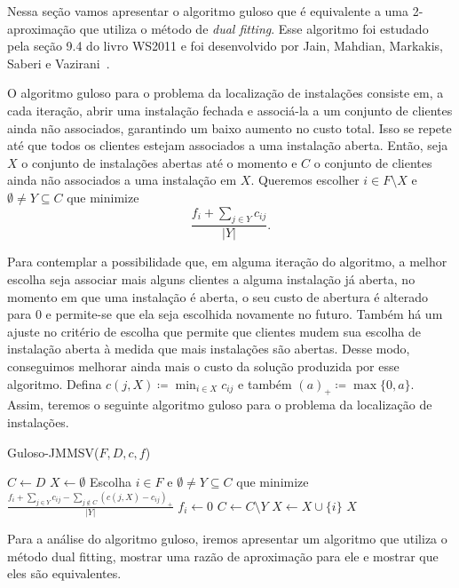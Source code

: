 Nessa seção vamos apresentar o algoritmo guloso que é equivalente a uma 2-aproximação que utiliza o método de \emph{dual fitting}. Esse algoritmo foi estudado pela seção 9.4 do livro WS2011 e foi desenvolvido por Jain, Mahdian, Markakis, Saberi e Vazirani~\cite{jain2002greedy}.

O algoritmo guloso para o problema da localização de instalações consiste em, a cada iteração, abrir uma instalação fechada e associá-la a um conjunto de clientes ainda não associados, garantindo um baixo aumento no custo total. 
Isso se repete até que todos os clientes estejam associados a uma instalação aberta. Então, seja $X$ o conjunto de instalações abertas até o momento e $C$ o conjunto de clientes ainda não associados a uma instalação em $X$. Queremos escolher $i \in F \setminus X$ e $\emptyset \neq Y \subseteq C$ que minimize
\[ \frac{f_i + \sum_{j \in Y} c_{ij}}{|Y|}.
    \] 

Para contemplar a possibilidade que, em alguma iteração do algoritmo, a melhor escolha seja associar mais alguns clientes a alguma instalação já aberta, no momento em que uma instalação é aberta, o seu custo de abertura é alterado para 0 e permite-se que ela seja escolhida novamente no futuro. Também há um ajuste no critério de escolha que permite que clientes mudem sua escolha de instalação aberta à medida que mais instalações são abertas. Desse modo, conseguimos melhorar ainda mais o custo da solução produzida por esse algoritmo. Defina $c(j,X) \coloneqq \min_{i \in X} c_{ij}$ e também $(a)_+\coloneqq\max\{0,a\}$. Assim, teremos o seguinte algoritmo guloso para o problema da localização de instalações.
\begin{algorithm}
    \caption{\sc Guloso-JMMSV($F,D,c,f$)}
    \begin{algorithmic}[1]
        \State $C \gets D$
        \State $X \gets \emptyset$
        \State Escolha $i \in F$ e $\emptyset \neq Y \subseteq C$ que minimize $\frac{f_i + \sum_{j \in Y}c_{ij} - \sum_{j \not \in C}(c(j,X) - c_{ij})_+ }{|Y|}$
        \State $f_i \gets 0$
        \State $C \gets C \setminus Y$
        \State $X \gets X \cup \{i\}$
        \EndWhile
        \State \Return $X$
    \end{algorithmic}
\end{algorithm}

Para a análise do algoritmo guloso, iremos apresentar um algoritmo que utiliza o método dual fitting, mostrar uma razão de aproximação para ele e mostrar que eles são equivalentes.

